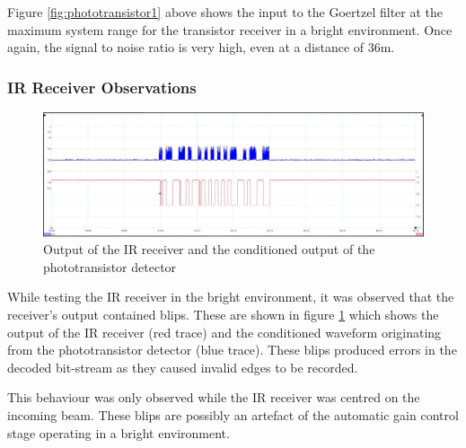 Figure \ref{fig:phototransistor1} above shows the input to the Goertzel filter at the maximum system range for the transistor receiver in a bright environment. Once again, the signal to noise ratio is very high, even at a distance of 36m.


\subsubsection{IR Receiver Observations}

\begin{figure}[H]
	\centering
	\includegraphics[width=.9\textwidth]{figures/results/system_test/36m_phototranaistoroutput_vs_ir_receiver.JPG}
	\caption{Output of the IR receiver and the conditioned output of the phototransistor detector}
	\label{fig:36m_phototranaistoroutput_vs_receiveroutput}
\end{figure}

While testing the IR receiver in the bright environment, it was observed that the receiver's output contained blips. These are shown in figure \ref{fig:36m_phototranaistoroutput_vs_receiveroutput} which shows the output of the IR receiver (red trace) and the conditioned waveform originating from the phototransistor detector (blue trace). These blips produced errors in the decoded bit-stream as they caused invalid edges to be recorded.

This behaviour was only observed while the IR receiver was centred on the incoming beam. These blips are possibly an artefact of the automatic gain control stage operating in a bright environment.

